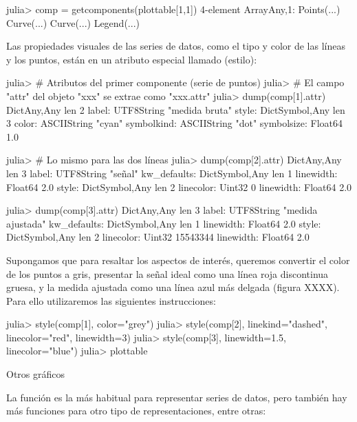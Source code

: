 ﻿\documentclass[spanish]{article}
\begin{document}
julia> comp = getcomponents(plottable[1,1])
4-element Array{Any,1}:
 Points(...)
 Curve(...) 
 Curve(...) 
 Legend(...)

Las propiedades visuales de las series de datos, como el tipo y color de las líneas y los puntos, están en un atributo especial llamado  (estilo):

julia> # Atributos del primer componente (serie de puntos)
julia> # El campo "attr" del objeto "xxx" se extrae como "xxx.attr"
julia> dump(comp[1].attr)
Dict{Any,Any} len 2
  label: UTF8String "medida bruta"
  style: Dict{Symbol,Any} len 3
    color: ASCIIString "cyan"
    symbolkind: ASCIIString "dot"
    symbolsize: Float64 1.0

julia> # Lo mismo para las dos líneas
julia> dump(comp[2].attr)
Dict{Any,Any} len 3
  label: UTF8String "señal"
  kw_defaults: Dict{Symbol,Any} len 1
    linewidth: Float64 2.0
  style: Dict{Symbol,Any} len 2
    linecolor: Uint32 0
    linewidth: Float64 2.0

julia> dump(comp[3].attr)
Dict{Any,Any} len 3
  label: UTF8String "medida ajustada"
  kw_defaults: Dict{Symbol,Any} len 1
    linewidth: Float64 2.0
  style: Dict{Symbol,Any} len 2
    linecolor: Uint32 15543344
    linewidth: Float64 2.0

Supongamos que para resaltar los aspectos de interés, queremos convertir el color de los puntos a gris, presentar la señal ideal como una línea roja discontinua gruesa, y la medida ajustada como una línea azul más delgada (figura XXXX). Para ello utilizaremos las siguientes instrucciones:

julia> style(comp[1], color="grey")
julia> style(comp[2], linekind="dashed", linecolor="red", linewidth=3)
julia> style(comp[3], linewidth=1.5, linecolor="blue")
julia> plottable

Otros gráficos

La función  es la más habitual para representar series de datos, pero también hay más funciones para otro tipo de representaciones, entre otras:
\end{document}
